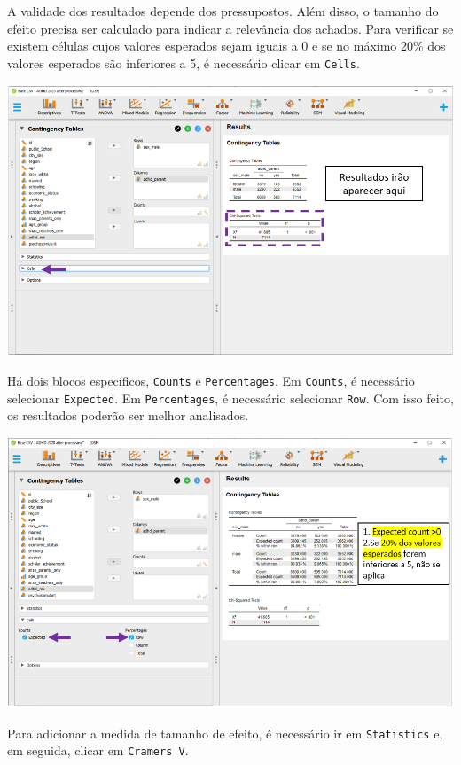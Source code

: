\documentclass[
]{book}
\begin{document}
A validade dos resultados depende dos pressupostos. Além disso, o tamanho do efeito precisa ser calculado para indicar a relevância dos achados. Para verificar se existem células cujos valores esperados sejam iguais a 0 e se no máximo 20\% dos valores esperados são inferiores a 5, é necessário clicar em \texttt{Cells}.

\includegraphics{./img/cap_x2_pressupostos.png}

Há dois blocos específicos, \texttt{Counts} e \texttt{Percentages}. Em \texttt{Counts}, é necessário selecionar \texttt{Expected}. Em \texttt{Percentages}, é necessário selecionar \texttt{Row}. Com isso feito, os resultados poderão ser melhor analisados.

\includegraphics{./img/cap_x2_pressupostos2.png}

Para adicionar a medida de tamanho de efeito, é necessário ir em \texttt{Statistics} e, em seguida, clicar em \texttt{Cramer\textquotesingle{}s\ V}.
\end{document}
